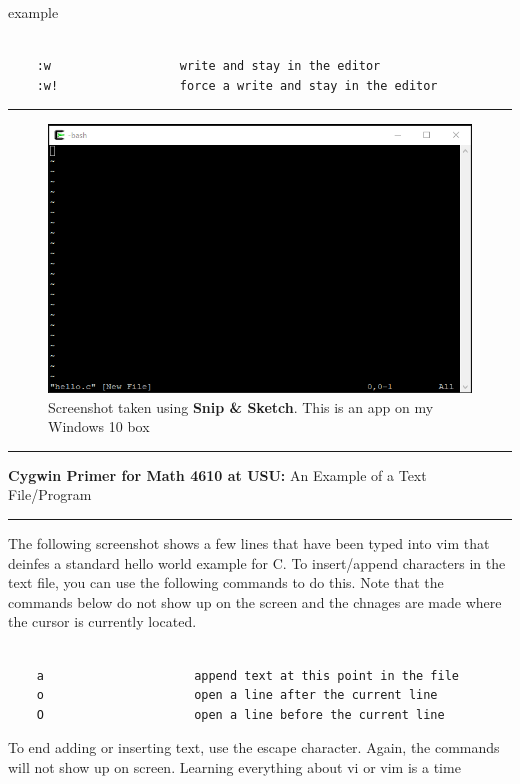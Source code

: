 \documentclass[10pt,fleqn]{article}
\begin{document}
example
\begin{verbatim}

    :w                  write and stay in the editor
    :w!                 force a write and stay in the editor

\end{verbatim}
\vskip0.1in\hrule\vskip0.1in
\vfill
\begin{figure}[h]
\centering
\includegraphics{../images/cygwin_06.png}
\caption{{Screenshot} taken using {\bf Snip \& Sketch}. This is an app on
         my Windows 10 box}
\end{figure}
\eject
\vskip0.1in\hrule\vskip0.1in
\noindent
{{\bf Cygwin Primer for Math 4610 at USU:} An Example of a Text File/Program} 
\vskip0.1in\hrule\vskip0.1in
\noindent
The following screenshot shows a few lines that have been typed into vim that
deinfes a standard hello world example for C. To insert/append characters in the
text file, you can use the following commands to do this. Note that the commands
below do not show up on the screen and the chnages are made where the cursor is
currently located.
\begin{verbatim}

    a                     append text at this point in the file
    o                     open a line after the current line
    O                     open a line before the current line

\end{verbatim}
To end adding or inserting text, use the escape character. Again, the commands
will not show up on screen. Learning everything about vi or vim is a time
\end{document}
